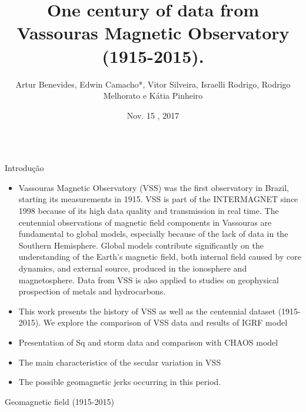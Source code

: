 \documentclass[final,t]{beamer}
\title{\huge One century of data from Vassouras Magnetic Observatory (1915-2015).}
\author[Benevides, Bassrei]{Artur Benevides, Edwin Camacho*, Vitor Silveira, Israelli Rodrigo, Rodrigo Melhorato e Kátia Pinheiro}
\institute[ON-MCTIC]{Observatório Nacional}
\date[Nov , 2017]{Nov. 15 , 2017}
\begin{document}
  \begin{columns}[t]
    \begin{column}{.33\linewidth}

\begin{block}{Introdução}
	
\begin{itemize}
\justifying
		\item Vassouras Magnetic Observatory (VSS) was the first observatory in Brazil, starting its	measurements in 1915. VSS is part of the INTERMAGNET since 1998 because of its high data quality and transmission in real time. The centennial observations of magnetic field components in Vassouras are fundamental to global models, especially because of the lack of data in the Southern Hemisphere. Global models contribute significantly on the understanding of the Earth's magnetic field, both internal field caused by core dynamics, and external source, produced in the ionosphere and magnetosphere. Data from VSS is also applied to studies on geophysical prospection of metals and hydrocarbons.
		
		\item This work presents the history of VSS as well as the centennial dataset (1915-2015). We	explore the comparison of VSS data and results of IGRF model
		
		\item  Presentation of Sq and storm data and comparison with CHAOS model
		
		\item The main characteristics of the secular variation in
		VSS
		
		\item The possible geomagnetic jerks occurring in this period.	
		
	\end{itemize}
	
\end{block}

\begin{block}{Geomagnetic field (1915-2015)}


\end{block}
\end{column}
\end{columns}
\end{document}
